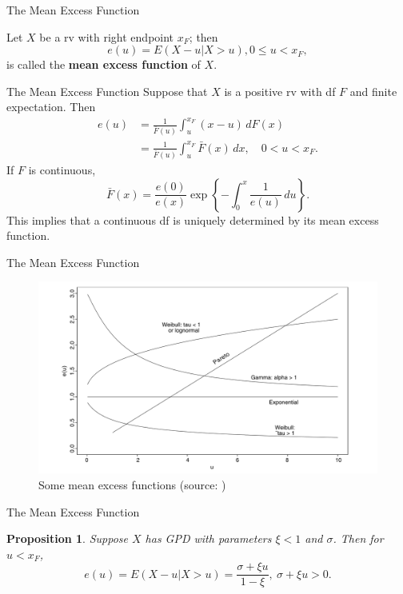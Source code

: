 \documentclass{beamer}
\newtheorem{proposition}{Proposition}
\begin{document}
\begin{frame}{The Mean Excess Function}
    \begin{definition}
        Let $X$ be a rv with right endpoint $x_F$; then
        \[
        e(u) = E(X - u | X > u), 0 \le u < x_F,
        \]
        is called the \textbf{mean excess function} of $X$.
    \end{definition}
\end{frame}

\begin{frame}{The Mean Excess Function}
    Suppose that $X$ is a positive rv with df $F$ and finite expectation. Then
    \begin{align*}
        e(u) &= \frac{1}{\bar{F}(u)}\int_u^{x_F} (x - u)\,dF(x) \\
        &= \frac{1}{\bar{F}(u)}\int_u^{x_F} \bar{F}(x)\,dx, \quad 0 < u < x_F.
    \end{align*}
    If $F$ is continuous,
    \[
    \bar{F}(x) = \frac{e(0)}{e(x)}\exp\left\{-\int_0^x \frac{1}{e(u)}\,du\right\}.
    \]
    This implies that a continuous df is uniquely determined by its mean excess function.
\end{frame}

\begin{frame}{The Mean Excess Function}
    \begin{figure}
        \centering
        \includegraphics[scale=0.32]{mean_excess_functions.png}
        \caption{Some mean excess functions (source: \cite{embrechts_et_al_1997})}
        \label{fig:mean_excess_functions}
    \end{figure}
\end{frame}

\begin{frame}{The Mean Excess Function}
    \begin{proposition}
        Suppose $X$ has GPD with parameters $\xi < 1$ and $\sigma$. Then for $u < x_F$,
        \[
        e(u) = E(X - u | X > u) = \frac{\sigma + \xi u}{1 - \xi}, \ \sigma + \xi u > 0.
        \]
    \end{proposition}
\end{frame}
\end{document}
